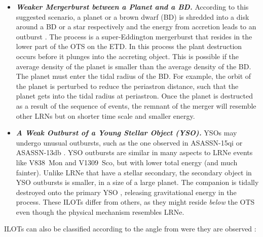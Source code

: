 \documentclass[modern]{aastex62}
\newcommand{\emphbf}[1]{\textbf{\emph{#1}}}
\begin{document}
\begin{itemize} 
\item \emphbf{Weaker Mergerburst between a Planet and a BD.} According to this suggested scenario, a planet or a brown dwarf (BD) is shredded into a disk around a BD or a star respectively and the energy from accretion leads to an outburst \citep{2011MNRAS.416.1965B}. 
The process is a super-Eddington mergerburst that resides in the lower part of the OTS on the ETD.
In this process the plant destruction occurs before it plunges into the accreting object.
This is possible if the average density of the planet is smaller than the average density of the BD.
The planet must enter the tidal radius of the BD. 
For example, the orbit of the planet is perturbed to reduce the periastron distance, such that the planet gets into the tidal radius at periastron.
Once the planet is destructed as a result of the sequence of events, the remnant of the merger will resemble other LRNs but on shorter time scale and smaller energy.

\item \emphbf{A Weak Outburst of a Young Stellar Object (YSO).} YSOs may undergo unusual outbursts, such as the one observed in ASASSN-15qi \citep{2016ApJ...831..133H} or ASASSN-13db \citep{2017A&A...607A.127S}.
YSO outbursts are similar in many aspects to LRNe events like V838~Mon and V1309~Sco, but with lower total energy (and much fainter). 
Unlike LRNe that have a stellar secondary, the secondary object in YSO outbursts is smaller, in a size of a large planet.
The companion is tidally destroyed onto the primary YSO \citep{2017MNRAS.468.4938K}, releasing gravitational energy in the process.
These ILOTs differ from others, as they might reside \emph{below} the OTS even though the physical mechanism resembles LRNe.

\end{itemize}

ILOTs can also be classified according to the angle from were they are observed \citep[in a similar manner to the classification of galaxies and active galactic nuclii (AGN)][]{2015ARA&A..53..365N}:
\end{document}
